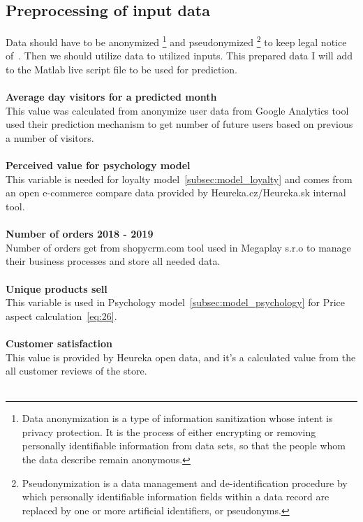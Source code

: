 \subsection{Preprocessing of input data} \label{subsec:preprocessing}
Data should have to be anonymized \footnote{Data anonymization is a type of information sanitization whose intent is privacy protection.
It is the process of either encrypting or removing personally identifiable information from data sets, so that
the people whom the data describe remain anonymous.} and pseudonymized \footnote{Pseudonymization is a data management
and de-identification procedure by which personally identifiable information fields within a data record are replaced
by one or more artificial identifiers, or pseudonyms.} to keep legal notice of~\cite{gdpr}.
Then we should utilize data to utilized inputs.
This prepared data I will add to the Matlab live script file to be used for prediction.\\
\\
\textbf{Average day visitors for a predicted month}\\
This value was calculated from anonymize user data from Google Analytics tool used their prediction mechanism to get number of future users based on previous a number of visitors.\\
\\
\textbf{Perceived value for psychology model} \label{perceived}\\
This variable is needed for loyalty model~\ref{subsec:model_loyalty} and comes from an open e-commerce compare data provided by Heureka.cz/Heureka.sk internal tool.\\
\\
\textbf{Number of orders 2018 - 2019}\\
Number of orders get from shopycrm.com tool used in Megaplay s.r.o to manage their business processes and store all needed data.\\
\\
\textbf{Unique products sell}\\
This variable is used in Psychology model~\ref{subsec:model_psychology} for Price aspect calculation~\ref{eq:26}.\\
\\
\textbf{Customer satisfaction} \label{customerSat}\\
This value is provided by Heureka open data, and it's a calculated value from the all customer reviews of the store.\\
\\
